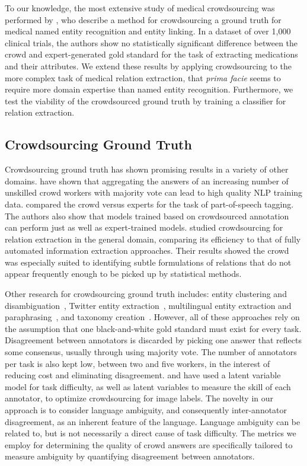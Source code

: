 To our knowledge, the most extensive study of medical crowdsourcing was performed by \citet{zhai2013web}, who describe a method for crowdsourcing a ground truth for medical named entity recognition and entity linking. In a dataset of over 1,000 clinical trials, the authors show no statistically significant difference between the crowd and expert-generated gold standard for the task of extracting medications and their attributes. We extend these results by applying crowdsourcing to the more complex task of medical relation extraction, that \textit{prima facie} seems to require more domain expertise than named entity recognition. Furthermore, we test the viability of the crowdsourced ground truth by training a classifier for relation extraction.

\subsection{Crowdsourcing Ground Truth}

Crowdsourcing ground truth has shown promising results in a variety of other domains. \citet{Snow2008} have shown that aggregating the answers of an increasing number of unskilled crowd workers with majority vote can lead to high quality NLP training data. \citet{hovy-plank-sogaard:2014:P14-2} compared the crowd versus experts for the task of part-of-speech tagging.  The authors also show that models trained based on crowdsourced annotation can perform just as well as expert-trained models. \citet{kondreddi2014combining} studied crowdsourcing for relation extraction in the general domain, comparing its efficiency to that of fully automated information extraction approaches.  Their results showed the crowd was especially suited to identifying subtle formulations of relations that do not appear frequently enough to be picked up by statistical methods.

Other research for crowdsourcing ground truth includes: entity clustering and disambiguation~\cite{Lee2013}, Twitter entity extraction~\cite{Finin2010}, multilingual entity extraction and paraphrasing~\cite{Chen2011}, and taxonomy creation~\cite{Chilton:2013}.  However, all of these approaches rely on the assumption that one black-and-white gold standard must exist for every task.  Disagreement between annotators is discarded by picking one answer that reflects some consensus, usually through using majority vote.  The number of annotators per task is also kept low, between two and five workers, in the interest of reducing cost and eliminating disagreement. \citet{NIPS2009_3644} and \citet{welinder2010multidimensional} have used a latent variable model for task difficulty, as well as latent variables to measure the skill of each annotator, to optimize crowdsourcing for image labels. The novelty in our approach is to consider language ambiguity, and consequently inter-annotator disagreement, as an inherent feature of the language. Language ambiguity can be related to, but is not necessarily a direct cause of task difficulty. The metrics we employ for determining the quality of crowd answers are specifically tailored to measure ambiguity by quantifying disagreement between annotators.


